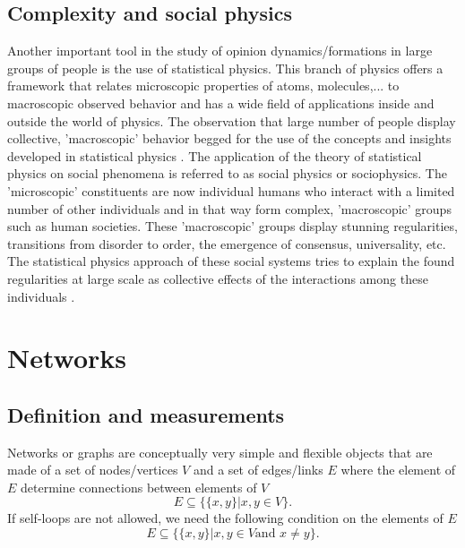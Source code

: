 \documentclass[11 pt , letterpaper , twoside , openright]{book}
\begin{document}

\section{Complexity and social physics}

Another important tool in the study of opinion dynamics/formations in large groups of people is the use of statistical physics. This branch of physics offers a framework that relates microscopic properties of atoms, molecules,... to macroscopic observed behavior and has a wide field of applications inside and outside the world of physics. The observation that large number of people display collective, 'macroscopic' behavior begged for the use of the concepts and insights developed in statistical physics \cite{Sirbu2016}. The application of the theory of statistical physics on social phenomena is referred to as social physics or sociophysics. The 'microscopic' constituents are now individual humans who interact with a limited number of other individuals and in that way form complex, 'macroscopic' groups such as human societies. These 'macroscopic' groups display stunning regularities, transitions from disorder to order, the emergence of consensus, universality, etc. The statistical physics approach of these social systems tries to explain the found regularities at large scale as collective effects of the interactions among these individuals \cite{Sirbu2016}.


\chapter{Networks}
\label{sec2}



\section{Definition and measurements}

Networks or graphs are conceptually very simple and flexible objects that are made of a set of nodes/vertices $V$ and a set of edges/links $E$ where the element of $E$ determine connections between elements of $V$
\begin{equation}
	E \subseteq \{\{x, y\}| x, y \in V \}.
\end{equation}
If self-loops are not allowed, we need the following condition on the elements of $E$
\begin{equation}
	E \subseteq \{\{x, y\}| x, y \in V \text{and\ } x \neq y \}.
\end{equation}
\end{document}
